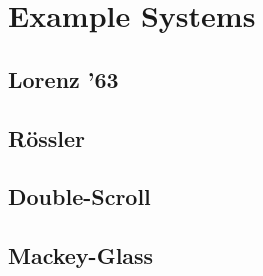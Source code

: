 \chapter{Example Systems}\label{ch:systems}

\section{Lorenz '63}

\section{R{\"{o}}ssler}

\section{Double-Scroll}

\section{Mackey-Glass}
